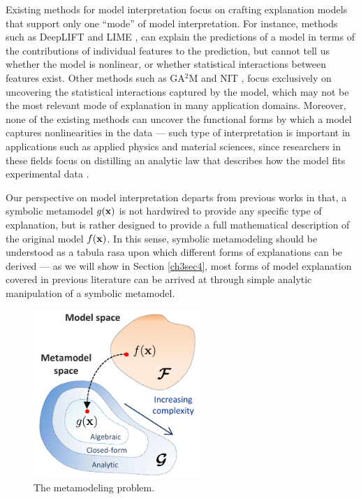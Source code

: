 \documentclass [PhD] {uclathes}
\begin{document}
Existing methods for model interpretation focus on crafting explanation models that support only one ``mode'' of model interpretation. For instance, methods such as DeepLIFT \cite{shrikumar2017learning} and LIME \cite{ribeiro2016should}, can explain the predictions of a model in terms of the contributions of individual features to the prediction, but cannot tell us whether the model is nonlinear, or whether statistical interactions between features exist. Other methods such as GA$^2$M \cite{lou2013accurate} and NIT \cite{tsang2018neural}, focus exclusively on uncovering the statistical interactions captured by the model, which may not be the most relevant mode of explanation in many application domains. Moreover, none of the existing methods can uncover the functional forms by which a model captures nonlinearities in the data --- such type of interpretation is important in applications such as applied physics and material sciences, since researchers in these fields focus on distilling an analytic law that describes how the model fits experimental data \cite{schmidt2009distilling,wang2019symbolic}.  

Our perspective on model interpretation departs from previous works in that, a symbolic metamodel $g({\bf x})$ is not hardwired to provide any specific type of explanation, but is rather designed to provide a full mathematical description of the original model $f({\bf x})$. In this sense, symbolic metamodeling should be understood as a tabula rasa upon which different forms of explanations can be derived --- as we will show in Section \ref{ch3sec4}, most forms of model explanation covered in previous literature can be arrived at through simple analytic manipulation of a symbolic metamodel. 

\begin{figure}[t]
\centering
\includegraphics[width=2.5in]{ch3Fig2.pdf}
\caption{The metamodeling problem.}
\label{ch3fig2} 
\end{figure}
\end{document}
